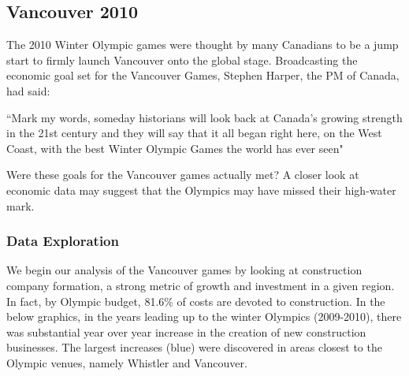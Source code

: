 \documentclass[11pt, twocolumn]{article}
\begin{document}
\subsection{Vancouver 2010}

The 2010 Winter Olympic games were thought by many Canadians to be a jump start to firmly launch Vancouver onto the global stage. Broadcasting the economic goal set for the Vancouver Games, Stephen Harper, the PM of Canada, had said: 
\begin{displayquote}
“Mark my words, someday historians will look back at Canada's growing strength in the 21st century and they will say that it all began right here, on the West Coast, with the best Winter Olympic Games the world has ever seen"\cite{olympics}
\end{displayquote}
 Were these goals for the Vancouver games actually met? A closer look at economic data may suggest that the Olympics may have missed their high-water mark. 

\subsubsection{Data Exploration}

    We begin our analysis of the Vancouver games by looking at construction company formation, a strong metric of growth and investment in a given region. In fact, by Olympic budget, 81.6\% of costs are devoted to construction. In the below graphics, in the years leading up to the winter Olympics (2009-2010), there was substantial year over year increase in the creation of new construction businesses. The largest increases (blue) were discovered in areas closest to the Olympic venues, namely Whistler and Vancouver.
    
\end{document}
